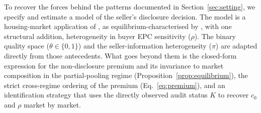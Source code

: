 To recover the forces behind the patterns documented in
Section~\ref{sec:setting}, we specify and estimate a model of the seller's disclosure
decision. The model is a housing-market application of \citet{dye_disclosure_1985}, as
equilibrium-characterised by \citet{jung_kwon_1988}, with one structural addition,
heterogeneity in buyer EPC sensitivity ($\rho$). The binary quality space
($\theta\in\{0,1\}$) and the seller-information heterogeneity ($\pi$) are adapted directly
from those antecedents. What goes beyond them is the closed-form expression for the
non-disclosure premium and its invariance to market composition in the partial-pooling
regime (Proposition~\ref{prop:equilibrium}), the strict cross-regime ordering of the premium
(Eq.~\ref{eq:premium}), and an identification strategy that uses the directly observed audit
status $K$ to recover $c_0$ and $\rho$ market by market.

